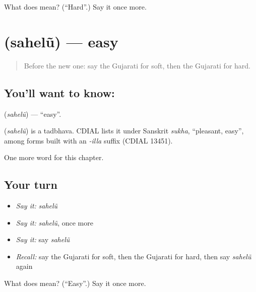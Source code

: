 \begin{tcolorbox}[breakable,colback=teal!4,colframe=teal!35!black,title={Before you move on}]
What does  mean? (\textquotedblleft{}Hard\textquotedblright{}.) Say it once more.
\end{tcolorbox}
\section[\texorpdfstring{\gu{સહેલું} (sahelũ)}{સહેલું (sahelũ)}]{ (sahelũ) — easy}

\label{lesson:GU-C133-sahelu}



\begin{quote}
Before the new one: say the Gujarati for soft, then the Gujarati for hard.
\end{quote}

\subsection*{You'll want to know: }
\textbf{} (\emph{sahelũ}) — \textquotedblleft{}easy\textquotedblright{}.

\begin{cousinweb}
\textbf{} (\emph{sahelũ}) is a tadbhava. CDIAL lists it under Sanskrit \emph{sukha}, \textquotedblleft{}pleasant, easy\textquotedblright{}, among forms built with an \emph{-illa} suffix (CDIAL 13451).
\end{cousinweb}

\begin{grammarlens}[title={What you've built}]
One more word for this chapter.
\end{grammarlens}

\subsection*{Your turn}
\begin{itemize}
\raggedright
  \item \emph{Say it:} \emph{sahelũ}
  \item \emph{Say it:} \emph{sahelũ}, once more
  \item \emph{Say it:} say \emph{sahelũ}
  \item \emph{Recall:} say the Gujarati for soft, then the Gujarati for hard, then say \emph{sahelũ} again
\end{itemize}

\begin{tcolorbox}[breakable,colback=teal!4,colframe=teal!35!black,title={Before you move on}]
What does  mean? (\textquotedblleft{}Easy\textquotedblright{}.) Say it once more.
\end{tcolorbox}
